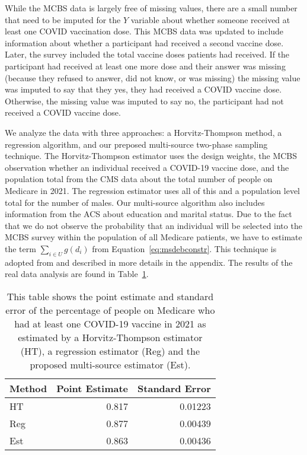 \documentclass[12pt]{article}
\begin{document}
While the MCBS data is largely free of missing values, there are a small number
that need to be imputed for the $Y$ variable about whether someone received at
least one COVID vaccination dose. This MCBS data was updated to include
information about whether a participant had received a second vaccine dose. 
Later, the survey included the total vaccine doses patients had received. If the
participant had received at least one more dose and their answer was missing
(because they refused to answer, did not know, or was missing) the missing value
was imputed to say that they yes, they had received a COVID vaccine dose.
Otherwise, the missing value was imputed to say no, the participant had not
received a COVID vaccine dose.

We analyze the data with three approaches: a Horvitz-Thompson method, a
regression algorithm, and our preposed multi-source two-phase sampling technique. 
The Horvitz-Thompson estimator uses the design weights, the MCBS observation
whether an individual received a COVID-19 vaccine dose, and the population total
from the CMS data about the total number of people on Medicare in 2021. The
regression estimator uses all of this and a population level total for the
number of males. Our multi-source algorithm also includes information from the
ACS about education and marital status. Due to the fact that we do not observe
the probability that an individual will be selected into the MCBS survey within
the population of all Medicare patients, we have to estimate the term $\sum_{i
\in U} g(d_i)$ from Equation~\ref{eq:msdebconstr}. This technique is adopted
from \cite{kwon2024debiased} and described in more details in the appendix.
The results of the real data analysis are found in Table~\ref{tab:mcbsres}.

\begin{table}[ht!]
  \centering
  \label{tab:mcbsres}
  \begin{tabular}{lrr}
    \toprule
    Method & Point Estimate & Standard Error \\
    \midrule
    HT  & 0.817 & 0.01223 \\
    Reg & 0.877 & 0.00439 \\
    Est & 0.863 & 0.00436 \\ 
    \bottomrule
  \end{tabular}
  \caption{This table shows the point estimate and standard error of the
  percentage of people on Medicare who had at least one COVID-19 vaccine in
  2021 as estimated by a Horvitz-Thompson estimator (HT), a regression estimator
  (Reg) and the proposed multi-source estimator (Est).}
\end{table}
\end{document}
